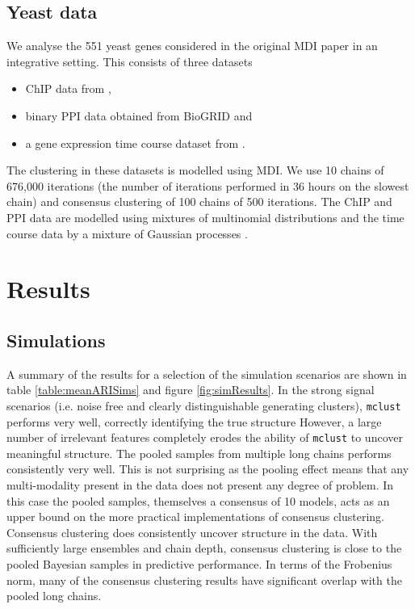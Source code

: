 \documentclass{bioinfo}
\begin{document}
\subsection{Yeast data}
We analyse the 551 yeast genes considered in the original MDI paper \citep{kirk2012bayesian} in an integrative setting. This consists of three datasets
\begin{itemize}
	\item  ChIP data from \cite{harbison2004transcriptional},
	\item binary PPI data obtained from BioGRID \citep{stark2006biogrid} and 
	\item a gene expression time course dataset from \cite{granovskaia2010high}.
\end{itemize}
The clustering in these datasets is modelled using MDI. We use 10 chains of 676,000 iterations (the number of iterations performed in 36 hours on the slowest chain) and consensus clustering of 100 chains of 500 iterations. The ChIP and PPI data are modelled using mixtures of multinomial distributions and the time course data by a mixture of Gaussian processes \citep[with dataset density choice following the original paper by ][]{kirk2012bayesian}.




\section{Results}
\subsection{Simulations}
A summary of the results for a selection of the simulation scenarios are shown in table \ref{table:meanARISims} and figure \ref{fig:simResults}. In the strong signal scenarios (i.e. noise free and clearly distinguishable generating clusters), \texttt{mclust} performs very well, correctly identifying the true structure However, a large number of irrelevant features completely erodes the ability of \texttt{mclust} to uncover meaningful structure. The pooled samples from multiple long chains performs consistently very well. This is not surprising as the pooling effect means that any multi-modality present in the data does not present any degree of problem. In this case the pooled samples, themselves a consensus of 10 models, acts as an upper bound on the more practical implementations of consensus clustering. Consensus clustering does consistently uncover structure in the data. With sufficiently large ensembles and chain depth, consensus clustering is close to the pooled Bayesian samples in predictive performance. In terms of the Frobenius norm, many of the consensus clustering results have significant overlap with the pooled long chains.
\end{document}

